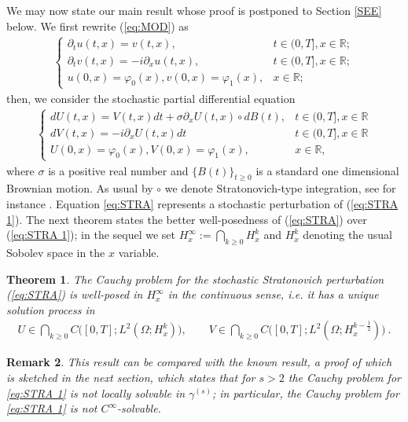 \documentclass{article}
\newtheorem{theorem}{Theorem}[section]
\newtheorem{remark}[theorem]{Remark}
\begin{document}
We may now state our main result whose proof is postponed to Section \ref{SEE} below. We first rewrite (\ref{eq:MOD}) as
\begin{align}
\label{eq:STRA 1}
\begin{cases}
\partial_tu(t,x) = v(t,x),& t\in(0,T], x\in\mathbb{R};\\
\partial_tv(t,x) = -i\partial_xu(t,x), & t\in(0,T], x\in\mathbb{R};\\
u(0,x)=\varphi_0(x),v(0,x)=\varphi_1(x),& x\in\mathbb{R};
\end{cases}
\end{align}
then, we consider the stochastic partial differential equation
\begin{align}
  \label{eq:STRA}
  \begin{cases}
    dU(t,x) = V(t,x) dt+ \sigma \partial_xU(t,x)\circ dB(t),& t\in(0,T], x\in\mathbb{R}\\
    dV(t,x) = -i\partial_x U(t,x)dt & t\in(0,T], x\in\mathbb{R}\\
    U(0,x)=\varphi_0(x),V(0,x)=\varphi_1(x),& x\in\mathbb{R},
  \end{cases}
\end{align}
where $ \sigma$ is a positive real number and $\{B(t)\}_{t\geq 0} $ is a standard one dimensional Brownian motion. As usual by  $ \circ $ we  denote
Stratonovich-type integration, see for instance \cite{MR1214374}. Equation \eqref{eq:STRA} represents a stochastic perturbation of (\ref{eq:STRA 1}). The next theorem states the better well-posedness of (\ref{eq:STRA}) over (\ref{eq:STRA 1}); in the sequel we set $H_{x}^{\infty}:=
\bigcap_{k\ge0}H_{x}^{k}$ and $H_{x}^{k}$ denoting the usual Sobolev space
in the $x$ variable.
\begin{theorem}
  \label{MTH}
The Cauchy problem for the stochastic Stratonovich perturbation (\ref{eq:STRA}) is well-posed in $H_x^\infty$ in the continuous 
sense, i.e. it has a unique solution process in
\begin{align*}
U\in \bigcap_{k\ge0}C\big([0,T];L^2(\Omega;H_x^k)\big) ,
\qquad
V\in \bigcap_{k\ge0} C\big([0,T];L^2(\Omega;H_x^{k-\frac12})\big)~.
\end{align*}
\end{theorem}

\begin{remark}
This result can be compared with the known result, a proof of which is sketched  in the next section, which states that for \(s>2\) the Cauchy problem for \eqref{eq:STRA 1} is not locally solvable in \(\gamma^{(s)}\); in particular, the Cauchy problem for \eqref{eq:STRA 1} is not \(C^{\infty}\)-solvable.
\end{remark}
\end{document}
